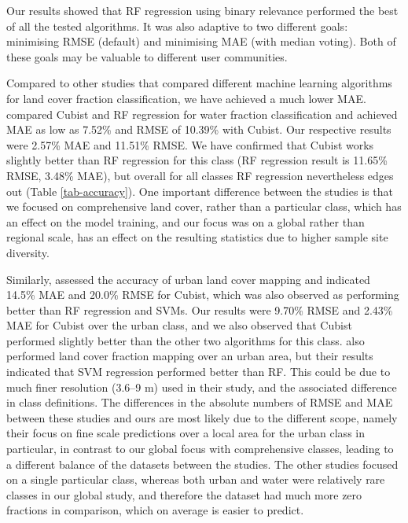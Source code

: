 \documentclass[review,authoryear,3p]{elsarticle}
\begin{document}
Our results showed that \gls{RF} regression using binary relevance performed the best of all the tested algorithms.
It was also adaptive to two different goals: minimising \gls{RMSE} (default) and minimising \gls{MAE} (with median voting).
Both of these goals may be valuable to different user communities.%

Compared to other studies that compared different machine learning algorithms for land cover fraction classification, we have achieved a much lower \gls{MAE}.
\citet{li_monitoring_2018} compared Cubist and \gls{RF} regression for water fraction classification and achieved \gls{MAE} as low as 7.52\% and \gls{RMSE} of 10.39\% with Cubist.
Our respective results were 2.57\% \gls{MAE} and 11.51\% RMSE.
We have confirmed that Cubist works slightly better than \gls{RF} regression for this class (\gls{RF} regression result is 11.65\% \gls{RMSE}, 3.48\% \gls{MAE}), but overall for all classes \gls{RF} regression nevertheless edges out (Table \ref{tab-accuracy}).
One important difference between the studies is that we focused on comprehensive land cover, rather than a particular class, which has an effect on the model training, and our focus was on a global rather than regional scale, has an effect on the resulting statistics due to higher sample site diversity.

Similarly, \citet{walton2008subpixelrf} assessed the accuracy of urban land cover mapping and indicated 14.5\% \gls{MAE} and 20.0\% \gls{RMSE} for Cubist, which was also observed as performing better than \gls{RF} regression and \glspl{SVM}.
Our results were 9.70\% \gls{RMSE} and 2.43\% \gls{MAE} for Cubist over the urban class, and we also observed that Cubist performed slightly better than the other two algorithms for this class.
\citet{okujeni_comparison_2014} also performed land cover fraction mapping over an urban area, but their results indicated that \gls{SVM} regression performed better than \gls{RF}.
This could be due to much finer resolution (3.6–9 m) used in their study, and the associated difference in class definitions.
The differences in the absolute numbers of \gls{RMSE} and \gls{MAE} between these studies and ours are most likely due to the different scope, namely their focus on fine scale predictions over a local area for the urban class in particular, in contrast to our global focus with comprehensive classes, leading to a different balance of the datasets between the studies.
The other studies focused on a single particular class, whereas both urban and water were relatively rare classes in our global study, and therefore the dataset had much more zero fractions in comparison, which on average is easier to predict.
\end{document}
